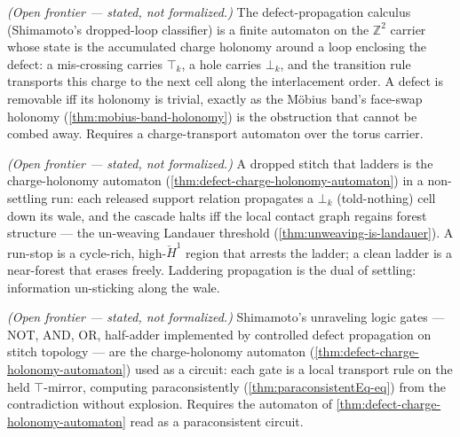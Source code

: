 \begin{theorem}\label{thm:defect-charge-holonomy-automaton}\notready{}
\emph{(Open frontier --- stated, not formalized.)} The defect-propagation calculus
(Shimamoto's dropped-loop classifier) is a finite automaton on the $\mathbb{Z}^2$ carrier
whose state is the accumulated charge holonomy around a loop enclosing the defect: a
mis-crossing carries $\top_k$, a hole carries $\bot_k$, and the transition rule transports
this charge to the next cell along the interlacement order. A defect is removable iff its
holonomy is trivial, exactly as the M\"obius band's face-swap holonomy
(\cref{thm:mobius-band-holonomy}) is the obstruction that cannot be combed away. Requires a
charge-transport automaton over the torus carrier.
\end{theorem}

\begin{theorem}\label{thm:laddering-charge-cascade}\notready{}
\emph{(Open frontier --- stated, not formalized.)} A dropped stitch that ladders is the
charge-holonomy automaton (\cref{thm:defect-charge-holonomy-automaton}) in a non-settling
run: each released support relation propagates a $\bot_k$ (told-nothing) cell down its wale,
and the cascade halts iff the local contact graph regains forest structure --- the
un-weaving Landauer threshold (\cref{thm:unweaving-is-landauer}). A run-stop is a
cycle-rich, high-$\check H^1$ region that arrests the ladder; a clean ladder is a near-forest
that erases freely. Laddering propagation is the dual of settling: information un-sticking
along the wale.
\end{theorem}

\begin{theorem}\label{thm:unraveling-gates-paraconsistent}\notready{}
\emph{(Open frontier --- stated, not formalized.)} Shimamoto's unraveling logic gates ---
NOT, AND, OR, half-adder implemented by controlled defect propagation on stitch topology ---
are the charge-holonomy automaton (\cref{thm:defect-charge-holonomy-automaton}) used as a
circuit: each gate is a local transport rule on the held $\top$-mirror, computing
paraconsistently (\cref{thm:paraconsistentEq-eq}) from the contradiction without explosion.
Requires the automaton of \cref{thm:defect-charge-holonomy-automaton} read as a
paraconsistent circuit.
\end{theorem}
